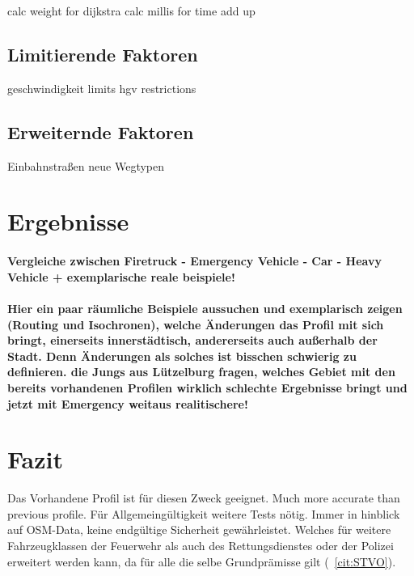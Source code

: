 \documentclass[12pt,a4paper]{article}
\begin{document}
calc weight for dijkstra
calc millis for time add up





\subsection{Limitierende Faktoren}

geschwindigkeit limits
hgv restrictions

\subsection{Erweiternde Faktoren}

Einbahnstraßen
neue Wegtypen

\newpage
\section{Ergebnisse}
\paragraph{
Vergleiche zwischen Firetruck - Emergency Vehicle - Car - Heavy Vehicle
+ exemplarische reale beispiele!
}
\paragraph{
\color{red}
Hier ein paar räumliche Beispiele aussuchen und exemplarisch zeigen (Routing und Isochronen), welche Änderungen das Profil mit sich bringt, einerseits innerstädtisch, andererseits auch außerhalb der Stadt. Denn Änderungen als solches ist bisschen schwierig zu definieren. die Jungs aus Lützelburg fragen, welches Gebiet mit den bereits vorhandenen Profilen wirklich schlechte Ergebnisse bringt und jetzt mit Emergency weitaus realitischere!
}

\newpage
\section{Fazit}

Das Vorhandene Profil ist für diesen Zweck geeignet.
Much more accurate than previous profile. 
Für Allgemeingültigkeit weitere Tests nötig. Immer in hinblick auf OSM-Data, keine endgültige Sicherheit gewährleistet.
Welches für weitere Fahrzeugklassen der Feuerwehr als auch des Rettungsdienstes oder der Polizei erweitert werden kann, da für alle die selbe Grundprämisse gilt (~\ref{cit:STVO}).
\end{document}
